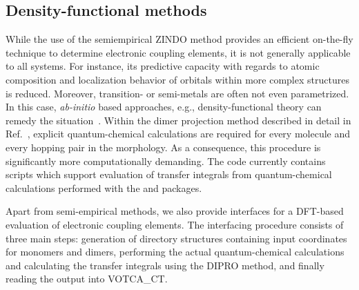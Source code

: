 \subsection{Density-functional methods}
\label{sec:dft}
While the use of the semiempirical ZINDO method provides an efficient on-the-fly technique to determine electronic coupling elements, it is not generally applicable to all systems. For instance, its predictive capacity with regards to atomic composition and localization behavior of orbitals within more complex structures is reduced. Moreover, transition- or semi-metals are often not even parametrized. In this case, {\it ab-initio} based approaches, e.g., density-functional theory can remedy the situation~\cite{huang_intermolecular_2004,huang_validation_2005,valeev_effect_2006,yin_balanced_2006,yang_theoretical_2007,baumeier_density-functional_2010}. Within the dimer projection method described in detail in Ref.~\cite{baumeier_density-functional_2010}, explicit quantum-chemical calculations are required for every molecule and every hopping pair in the morphology. As a consequence, this procedure is significantly more computationally demanding. The code currently contains scripts which support evaluation of transfer integrals from quantum-chemical calculations performed with the \gaussian and \turbomole packages.

Apart from semi-empirical methods, we also provide interfaces for a DFT-based evaluation of electronic coupling elements. The interfacing procedure consists of three main steps: generation of directory structures containing input coordinates for monomers and dimers, performing the actual quantum-chemical calculations and calculating the transfer integrals using the DIPRO method, and finally reading the output into VOTCA\_CT.

